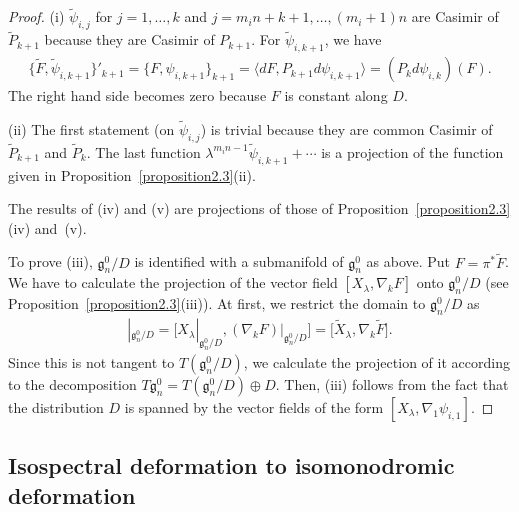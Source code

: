 \documentclass[pdftex]{sigma}
\numberwithin{equation}{section}
\begin{document}
\begin{proof}
(i) $\widetilde{\psi}_{i,j}$ for $j=1,\dots ,k$ and $j=m_in+k+1, \dots , (m_i+1)n$ are Casimir of $\widetilde{P}_{k+1}$ because they are Casimir of $P_{k+1}$. For $\widetilde{\psi}_{i,k+1}$, we have
\begin{gather*}
\big\{ \widetilde{F}, \widetilde{\psi}_{i,k+1} \big\}'_{k+1}
 = \{ F, \psi_{i, k+1}\}_{k+1} = \langle dF , P_{k+1}d\psi_{i,k+1}\rangle = (P_k d\psi_{i,k})(F).
\end{gather*}
The right hand side becomes zero because $F$ is constant along $D$.

(ii) The f\/irst statement (on $\widetilde{\psi}_{i,j}$) is trivial because they are common Casimir of $\widetilde{P}_{k+1}$ and $\widetilde{P}_k$.
The last function $\lambda ^{m_in-1} \widetilde{\psi}_{i,k+1} + \cdots $ is a projection of the function given in Proposition~\ref{proposition2.3}(ii).

The results of (iv) and (v) are projections of those of Proposition~\ref{proposition2.3}(iv) and~(v).

To prove (iii), $\mathfrak{g}^0_n/D$ is identif\/ied with a submanifold of $\mathfrak{g}^0_n$ as above. Put $F = \pi^* \widetilde{F}$. We have to calculate the projection of the vector f\/ield $[X_\lambda , \nabla _kF]$ onto $\mathfrak{g}^0_n/D$ (see Proposition~\ref{proposition2.3}(iii)).
At f\/irst, we restrict the domain to $\mathfrak{g}^0_n/D$ as
\begin{gather*}
[X_\lambda , \nabla _kF]|_{\mathfrak{g}^0_n/D}
 = \big[X_\lambda |_{\mathfrak{g}^0_n/D}, (\nabla_k F)|_{\mathfrak{g}^0_n/D}\big]
 = \big[\widetilde{X}_\lambda , \nabla _k \widetilde{F}\big].
\end{gather*}
Since this is not tangent to $T(\mathfrak{g}^0_n/D)$, we calculate the projection of it according to the decomposition $T\mathfrak{g}^0_n = T(\mathfrak{g}^0_n/D) \oplus D$. Then, (iii) follows from the fact that the distribution $D$ is spanned by the vector f\/ields of the form $[X_\lambda , \nabla _1 \psi _{i,1}]$.
\end{proof}

\subsection{Isospectral deformation to isomonodromic deformation}\label{section2.4}
\end{document}
